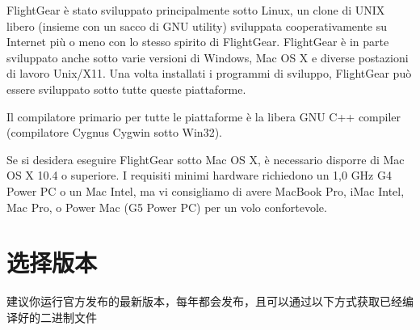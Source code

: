 {FlightGear \`{e} stato sviluppato principalmente sotto Linux, un clone di UNIX libero (insieme
con un sacco di GNU utility) sviluppata cooperativamente su Internet pi\`{u} o meno con lo stesso
spirito di FlightGear. FlightGear \`{e} in parte sviluppato anche sotto varie versioni di Windows,
Mac OS X e diverse postazioni di lavoro Unix/X11. Una volta installati i programmi di sviluppo,
FlightGear pu\`{o} essere sviluppato sotto tutte queste piattaforme.

Il compilatore primario per tutte le piattaforme \`{e} la libera GNU C++ compiler (compilatore
Cygnus Cygwin sotto Win32).

Se si desidera eseguire FlightGear sotto Mac OS X, \`{e} necessario disporre di Mac OS X 10.4 o
superiore. I requisiti minimi hardware richiedono un 1,0 GHz G4 Power PC o un Mac Intel, ma vi
consigliamo di avere MacBook Pro, iMac Intel, Mac Pro, o Power Mac (G5 Power PC) per un volo
confortevole.
}{}

\ifchinese
\section{选择版本}
\fi
\ifchinese
建议你运行官方发布的最新版本，每年都会发布，且可以通过以下方式获取已经编译好的二进制文件
\fi


